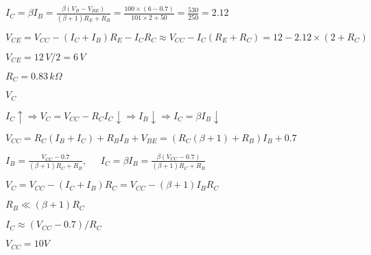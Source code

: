 \documentclass{article}
\def\lthtmlcheckvsize{\ifdim\ht\sizebox<\vsize 
  \ifdim\wd\sizebox<\hsize\expandafter\hfill\fi \expandafter\vfill
  \else\expandafter\vss\fi}%
\begin{document}
{\newpage\clearpage
{}%
$\displaystyle I_C=\beta I_B=\frac{\beta(V_B-V_{BE})}{(\beta+1)R_E+R_B}
=\frac{100\times(6-0.7)}{101\times 2+50}=\frac{530}{250}=2.12$%
\lthtmlindisplaymathZ
\lthtmlcheckvsize\clearpage}

{\newpage\clearpage
{}%
$\displaystyle V_{CE}=V_{CC}-(I_C+I_B) R_E-I_CR_C\approx V_{CC}-I_C(R_E+R_C)
=12-2.12\times (2+R_C)$%
\lthtmlindisplaymathZ
\lthtmlcheckvsize\clearpage}

{\newpage\clearpage
{}%
$ V_{CE}=12\,V/2=6\,V$%
\lthtmlindisplaymathZ
\lthtmlcheckvsize\clearpage}

{\newpage\clearpage
{}%
$ R_C=0.83\,k\Omega$%
\lthtmlindisplaymathZ
\lthtmlcheckvsize\clearpage}

{\newpage\clearpage
{}%
$ V_C$%
\lthtmlindisplaymathZ
\lthtmlcheckvsize\clearpage}

{\newpage\clearpage
{}%
$\displaystyle I_C \uparrow \Longrightarrow V_C=V_{CC}-R_CI_C \downarrow
\Longrightarrow I_B\downarrow \Longrightarrow
I_C=\beta I_B \downarrow$%
\lthtmlindisplaymathZ
\lthtmlcheckvsize\clearpage}

{\newpage\clearpage
{}%
$\displaystyle V_{CC}=R_C(I_B+I_C)+R_BI_B+V_{BE}=(R_C(\beta+1)+R_B)I_B+0.7$%
\lthtmlindisplaymathZ
\lthtmlcheckvsize\clearpage}

{\newpage\clearpage
{}%
$\displaystyle I_B=\frac{V_{CC}-0.7}{(\beta+1)R_C+R_B},\;\;\;\;\;
I_C=\beta I_B=\frac{\beta(V_{CC}-0.7)}{(\beta+1)R_C+R_B}$%
\lthtmlindisplaymathZ
\lthtmlcheckvsize\clearpage}

{\newpage\clearpage
{}%
$\displaystyle V_C=V_{CC}-(I_C+I_B)R_C=V_{CC}-(\beta+1)I_BR_C$%
\lthtmlindisplaymathZ
\lthtmlcheckvsize\clearpage}

{\newpage\clearpage
{}%
$ R_B \ll (\beta+1)R_C $%
\lthtmlindisplaymathZ
\lthtmlcheckvsize\clearpage}

{\newpage\clearpage
{}%
$ I_C \approx (V_{CC}-0.7)/R_C$%
\lthtmlindisplaymathZ
\lthtmlcheckvsize\clearpage}

{\newpage\clearpage
{}%
$ V_{CC}=10V$%
\lthtmlindisplaymathZ
\lthtmlcheckvsize\clearpage}
\end{document}
